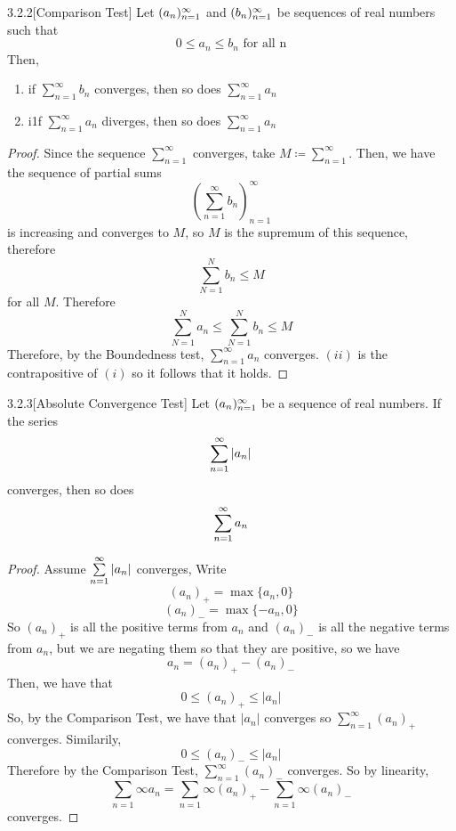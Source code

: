 \documentclass[openany]{report}
\begin{document}
\begin{manualprop}{3.2.2}[Comparison Test]
    Let $({a}_n)_{n=1}^\infty$ and $({b}_n)_{n=1}^\infty$ be sequences of real numbers such that
    \[0 \leq a_n \leq b_n \text{ for all n}\]
    Then,
    \begin{enumerate}[label=(\roman*)]
        \item if $\sum\limits_{n=1}^\infty b_n$ converges, then so does $\sum\limits_{n=1}^\infty a_n$
        \item i1f $\sum\limits_{n=1}^\infty a_n$ diverges, then so does $\sum\limits_{n=1}^\infty a_n$
    \end{enumerate}
\end{manualprop}
\begin{proof}
    Since the sequence $\sum\limits_{n=1}^\infty$ converges, take $M \coloneqq \sum\limits_{n=1}^\infty$. Then, we have the sequence of partial sums 
    \[\left(\sum_{n=1}^\infty b_n\right)_{n=1}^\infty\]
    is increasing and converges to $M$, so $M$ is the supremum of this sequence, therefore
    \[\sum_{N=1}^N b_n \leq M \]
    for all $M$. Therefore
    \[\sum_{N=1}^N a_n \leq \sum_{N=1}^N b_n \leq M\]
    Therefore, by the Boundedness test, $\sum\limits_{n=1}^\infty a_n$ converges. $(ii)$ is the contrapositive of $(i)$ so it follows that it holds. 
\end{proof}

\begin{manualprop}{3.2.3}[Absolute Convergence Test]
    Let $({a}_n)_{n=1}^\infty$ be a sequence of real numbers. If the series 
    \[\sum\limits_{n=1}^\infty |a_n|\]
    converges, then so does 
    \[\sum\limits_{n=1}^\infty a_n\]
\end{manualprop}
\begin{proof}
    Assume $\sum\limits_{n=1}^\infty |a_n|$ converges, Write 
    \[(a_n)_+ = \max\{a_n, 0\}\]
    \[(a_n)_- = \max\{-a_n, 0\}\]
    So $(a_n)_+$ is all the positive terms from $a_n$ and $(a_n)_-$ is all the negative terms from $a_n$, but we are negating them so that they are positive, so we have 
    \[a_n = (a_n)_+ - (a_n)_-\]
    Then, we have that 
    \[0 \leq (a_n)_+ \leq |a_n|\] 
    So, by the Comparison Test, we have that $|a_n|$ converges so $\sum\limits_{n=1}^\infty (a_n)_+$ converges. Similarily, 
    \[0 \leq (a_n)_- \leq |a_n|\]
    Therefore by the Comparison Test, $\sum\limits_{n=1}^\infty (a_n)_-$ converges. So by linearity,
    \[\sum_{n=1}\infty a_n = \sum_{n=1}\infty (a_n)_+ - \sum_{n=1}\infty (a_n)_- \]
    converges.
\end{proof}
\end{document}
